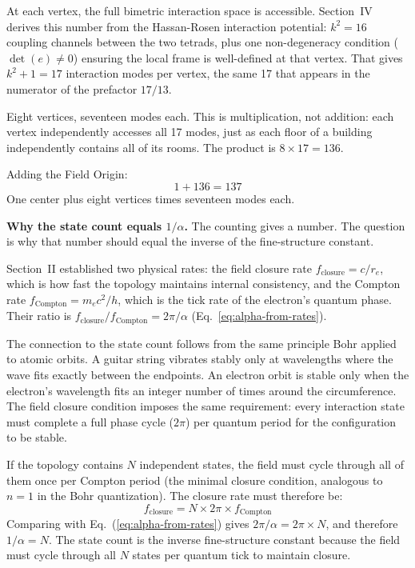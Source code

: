 \documentclass[11pt]{article}
\begin{document}
At each vertex, the full bimetric interaction space is accessible.
Section~IV derives this number from the Hassan-Rosen interaction potential: $k^2 = 16$ coupling channels between the two tetrads, plus one non-degeneracy condition ($\det(e) \neq 0$) ensuring the local frame is well-defined at that vertex.
That gives $k^2 + 1 = 17$ interaction modes per vertex, the same 17 that appears in the numerator of the prefactor $17/13$.

Eight vertices, seventeen modes each.
This is multiplication, not addition: each vertex independently accesses all 17 modes, just as each floor of a building independently contains all of its rooms.
The product is $8 \times 17 = 136$.

Adding the Field Origin:
\begin{equation*}
1 + 136 = 137
\end{equation*}
One center plus eight vertices times seventeen modes each.

\textbf{Why the state count equals $1/\alpha$.}\quad
The counting gives a number.
The question is why that number should equal the inverse of the fine-structure constant.

Section~II established two physical rates: the field closure rate $f_{\text{closure}} = c/r_e$, which is how fast the topology maintains internal consistency, and the Compton rate $f_{\text{Compton}} = m_e c^2/h$, which is the tick rate of the electron's quantum phase.
Their ratio is $f_{\text{closure}}/f_{\text{Compton}} = 2\pi/\alpha$ (Eq.~\ref{eq:alpha-from-rates}).

The connection to the state count follows from the same principle Bohr applied to atomic orbits.
A guitar string vibrates stably only at wavelengths where the wave fits exactly between the endpoints.
An electron orbit is stable only when the electron's wavelength fits an integer number of times around the circumference.
The field closure condition imposes the same requirement: every interaction state must complete a full phase cycle ($2\pi$) per quantum period for the configuration to be stable.

If the topology contains $N$ independent states, the field must cycle through all of them once per Compton period (the minimal closure condition, analogous to $n = 1$ in the Bohr quantization).
The closure rate must therefore be:
%
\begin{equation*}
f_{\text{closure}} = N \times 2\pi \times f_{\text{Compton}}
\end{equation*}
%
Comparing with Eq.~(\ref{eq:alpha-from-rates}) gives $2\pi/\alpha = 2\pi \times N$, and therefore $1/\alpha = N$.
The state count is the inverse fine-structure constant because the field must cycle through all $N$ states per quantum tick to maintain closure.
\end{document}
